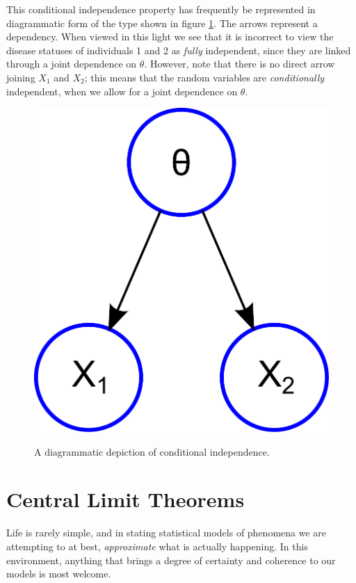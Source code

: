\documentclass[11pt,fullpage]{book}
\begin{document}
This conditional independence property has frequently be represented in diagrammatic form of the type shown in figure \ref{fig:Probability_conditionalIndependence}. The arrows represent a dependency. When viewed in this light we see that it is incorrect to view the disease statuses of individuals 1 and 2 as \textit{fully} independent, since they are linked through a joint dependence on $\theta$. However, note that there is no direct arrow joining $X_1$ and $X_2$; this means that the random variables are \textit{conditionally} independent, when we allow for a joint dependence on $\theta$. 

\begin{figure}
\centering
\scalebox{0.4} 
{\includegraphics{Probability_conditionalIndependence.pdf}}
\caption{A diagrammatic depiction of conditional independence.}\label{fig:Probability_conditionalIndependence}
\end{figure}

\section{Central Limit Theorems}\label{sec:Probability_CLT}
Life is rarely simple, and in stating statistical models of phenomena we are attempting to at best, \textit{approximate} what is actually happening. In this environment, anything that brings a degree of certainty and coherence to our models is most welcome. 
\end{document}
